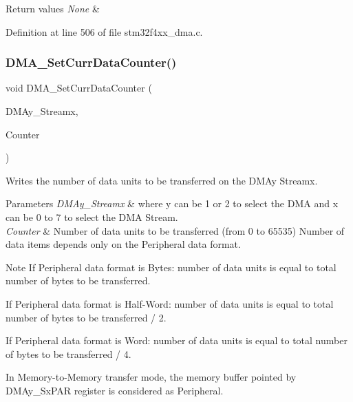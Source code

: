 \begin{DoxyRetVals}{Return values}
{\em None} & \\
\hline
\end{DoxyRetVals}


Definition at line 506 of file stm32f4xx\+\_\+dma.\+c.

\mbox{\label{group___d_m_a_ga6a11a2c951cff59b125ba8857d44e3f3}} 
\subsubsection{\texorpdfstring{D\+M\+A\+\_\+\+Set\+Curr\+Data\+Counter()}{DMA\_SetCurrDataCounter()}}
{\footnotesize\ttfamily void D\+M\+A\+\_\+\+Set\+Curr\+Data\+Counter (\begin{DoxyParamCaption}\item[{\hyperlink{struct_d_m_a___stream___type_def}{D\+M\+A\+\_\+\+Stream\+\_\+\+Type\+Def} $\ast$}]{D\+M\+Ay\+\_\+\+Streamx,  }\item[{uint16\+\_\+t}]{Counter }\end{DoxyParamCaption})}



Writes the number of data units to be transferred on the D\+M\+Ay Streamx. 


\begin{DoxyParams}{Parameters}
{\em D\+M\+Ay\+\_\+\+Streamx} & where y can be 1 or 2 to select the D\+MA and x can be 0 to 7 to select the D\+MA Stream. \\
\hline
{\em Counter} & Number of data units to be transferred (from 0 to 65535) Number of data items depends only on the Peripheral data format.\\
\hline
\end{DoxyParams}
\begin{DoxyNote}{Note}
If Peripheral data format is Bytes\+: number of data units is equal to total number of bytes to be transferred.

If Peripheral data format is Half-\/\+Word\+: number of data units is equal to total number of bytes to be transferred / 2.

If Peripheral data format is Word\+: number of data units is equal to total number of bytes to be transferred / 4.

In Memory-\/to-\/\+Memory transfer mode, the memory buffer pointed by D\+M\+Ay\+\_\+\+Sx\+P\+AR register is considered as Peripheral.
\end{DoxyNote}

